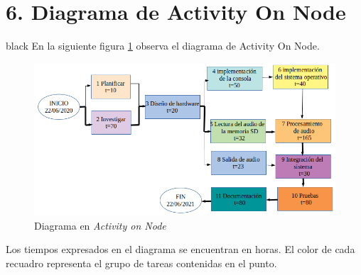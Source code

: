 \documentclass[11pt]{charter}
\begin{document}
\section{6. Diagrama de Activity On Node}
\label{sec:AoN}

\begin{consigna}{black}
En la siguiente figura \ref{fig:AoN} observa el diagrama de Activity On Node.

\begin{figure}[htpb]
\centering 
\includegraphics[width=.9\textwidth]{./Figuras/AoN.png}
\caption{Diagrama en \textit{Activity on Node}}
\label{fig:AoN}
\end{figure}


Los tiempos expresados en el diagrama se encuentran en horas. El color de cada recuadro
representa el grupo de tareas contenidas en el punto.

\end{consigna}
\end{document}
